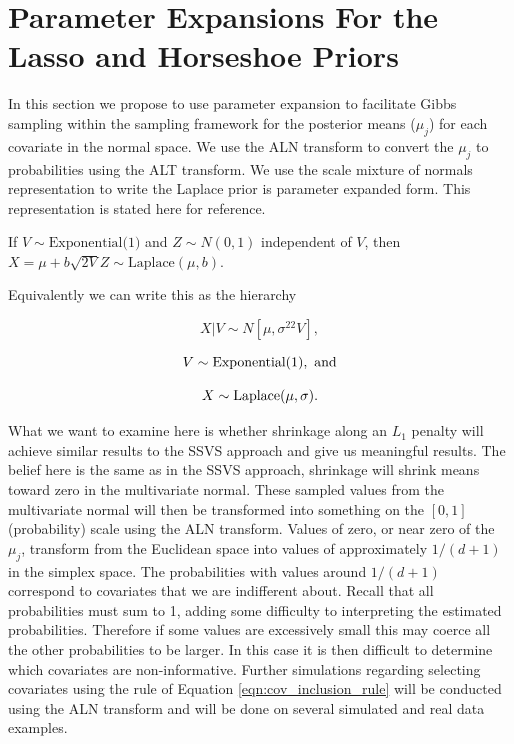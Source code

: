 \section{Parameter Expansions For the Lasso and Horseshoe Priors}\label{sec:PX_2}
In this section we propose to use parameter expansion to facilitate Gibbs sampling within the sampling framework for the posterior means ($\mu_j$) for each covariate in the normal space. We use the ALN transform to convert the $\mu_j$ to probabilities using the ALT transform. 
We use the scale mixture of normals representation to write the Laplace prior is parameter expanded form. This representation is stated here for reference.

If $V \sim \text{Exponential(1)}$ and $Z \sim N(0, 1)$ independent of $V$, then $X = \mu + b \sqrt{2 V}Z \sim \mathrm{Laplace}(\mu,b)$. 

Equivalently we can write this as the hierarchy

\begin{equation}\label{eqn:normal_cond_lhood_lasso}
X \vert V \sim N[\mu, \sigma^22V],
\end{equation}

\begin{equation}\newnot{symbol:exponential_dist}
V \sim \text{Exponential}(1), \text{ and}
\end{equation}

\begin{equation}\newnot{symbol:laplace_dist}
X \sim \text{Laplace}(\mu, \sigma).
\end{equation}

What we want to examine here is whether shrinkage along an $L_1$ penalty will achieve similar results to the SSVS approach and give us meaningful results. The belief here is the same as in the SSVS approach, shrinkage will shrink means toward zero in the multivariate normal. These sampled values from the multivariate normal will then be transformed into something on the $[0,1]$ (probability) scale using the ALN transform. Values of zero, or near zero of the $\mu_j$, transform from the Euclidean space into values of approximately $1/(d+1)$ in the simplex space. The probabilities with values around $1/(d+1)$ correspond to covariates that we are indifferent about. Recall that all probabilities must sum to 1, adding some difficulty to interpreting the estimated probabilities. Therefore if some values are excessively small this may coerce all the other probabilities to be larger. In this case it is then difficult to determine which covariates are non-informative. Further simulations regarding selecting covariates using the rule of Equation \ref{eqn:cov_inclusion_rule} will be conducted using the ALN transform and will be done on several simulated and real data examples.    

